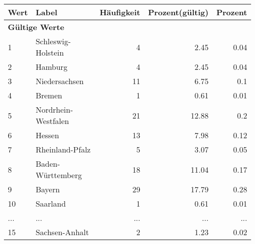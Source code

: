      \begin{longtable}{lXrrr}
     \toprule
     \textbf{Wert} & \textbf{Label} & \textbf{Häufigkeit} & \textbf{Prozent(gültig)} & \textbf{Prozent} \\
     \endhead
     \midrule
     \multicolumn{5}{l}{\textbf{Gültige Werte}}\\
        1 & \multicolumn{1}{X}{Schleswig-Holstein} & %
          \num{4} &
          \num[round-mode=places,round-precision=2]{2,45} &
          \num[round-mode=places,round-precision=2]{0,04} \\
        2 & \multicolumn{1}{X}{Hamburg} & %
          \num{4} &
          \num[round-mode=places,round-precision=2]{2,45} &
          \num[round-mode=places,round-precision=2]{0,04} \\
        3 & \multicolumn{1}{X}{Niedersachsen} & %
          \num{11} &
          \num[round-mode=places,round-precision=2]{6,75} &
          \num[round-mode=places,round-precision=2]{0,1} \\
        4 & \multicolumn{1}{X}{Bremen} & %
          \num{1} &
          \num[round-mode=places,round-precision=2]{0,61} &
          \num[round-mode=places,round-precision=2]{0,01} \\
        5 & \multicolumn{1}{X}{Nordrhein-Westfalen} & %
          \num{21} &
          \num[round-mode=places,round-precision=2]{12,88} &
          \num[round-mode=places,round-precision=2]{0,2} \\
        6 & \multicolumn{1}{X}{Hessen} & %
          \num{13} &
          \num[round-mode=places,round-precision=2]{7,98} &
          \num[round-mode=places,round-precision=2]{0,12} \\
        7 & \multicolumn{1}{X}{Rheinland-Pfalz} & %
          \num{5} &
          \num[round-mode=places,round-precision=2]{3,07} &
          \num[round-mode=places,round-precision=2]{0,05} \\
        8 & \multicolumn{1}{X}{Baden-Württemberg} & %
          \num{18} &
          \num[round-mode=places,round-precision=2]{11,04} &
          \num[round-mode=places,round-precision=2]{0,17} \\
        9 & \multicolumn{1}{X}{Bayern} & %
          \num{29} &
          \num[round-mode=places,round-precision=2]{17,79} &
          \num[round-mode=places,round-precision=2]{0,28} \\
        10 & \multicolumn{1}{X}{Saarland} & %
          \num{1} &
          \num[round-mode=places,round-precision=2]{0,61} &
          \num[round-mode=places,round-precision=2]{0,01} \\
       ... & ... & ... & ... & ... \\
        15 & \multicolumn{1}{X}{Sachsen-Anhalt} & %
          \num{2} &
          \num[round-mode=places,round-precision=2]{1,23} &
          \num[round-mode=places,round-precision=2]{0,02} \\


\end{longtable}
